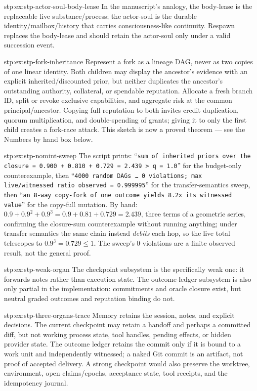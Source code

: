 \begin{pdSolution}{stp:ex:stp-actor-soul-body-lease}
In the manuscript's analogy, the body-lease is the replaceable live
substance/process; the actor-soul is the durable identity/mailbox/history that
carries consciousness-like continuity. Respawn replaces the body-lease and
should retain the actor-soul only under a valid succession event.
\end{pdSolution}
\begin{pdSolution}{stp:ex:stp-fork-inheritance}
Represent a fork as a lineage DAG, never as two copies of one linear identity.
Both children may display the ancestor's evidence with an explicit
inherited/discounted prior, but neither duplicates the ancestor's outstanding
authority, collateral, or spendable reputation. Allocate a fresh branch ID,
split or revoke exclusive capabilities, and aggregate risk at the common
principal/ancestor. Copying full reputation to both invites credit
duplication, quorum multiplication, and double-spending of grants; giving it
to only the first child creates a fork-race attack. This sketch is now a
proved theorem --- see the Numbers by hand box below.
\end{pdSolution}
\begin{pdSolution}{stp:ex:stp-nomint-sweep}
The script prints: ``\texttt{sum of inherited priors over the closure = 0.900
+ 0.810 + 0.729 = 2.439 > q = 1.0}'' for the budget-only counterexample, then
``\texttt{4000 random DAGs \dots{} 0 violations; max live/witnessed ratio
observed = 0.999995}'' for the transfer-semantics sweep, then ``\texttt{an
8-way copy-fork of one outcome yields 8.2x its witnessed value}'' for the
copy-full mutation. By hand: $0.9+0.9^2+0.9^3=0.9+0.81+0.729=2.439$, three
terms of a geometric series, confirming the closure-sum counterexample without
running anything; under transfer semantics the same chain instead \emph{debits}
each hop, so the live total telescopes to $0.9^3=0.729\le 1$.
The sweep's $0$ violations are a finite observed result, not the general proof.
\end{pdSolution}
\begin{pdSolution}{stp:ex:stp-weak-organ}
The checkpoint subsystem is the specifically weak one: it forwards notes rather
than execution state. The outcome-ledger subsystem is also only partial in the
implementation: commitments and oracle closure exist, but neutral graded
outcomes and reputation binding do not.
\end{pdSolution}
\begin{pdSolution}{stp:ex:stp-three-organs-trace}
Memory retains the session, notes, and explicit decisions. The current
checkpoint may retain a handoff and perhaps a committed diff, but not working
process state, tool handles, pending effects, or hidden provider state. The
outcome ledger retains the commit only if it is bound to a work unit and
independently witnessed; a naked Git commit is an artifact, not proof of
accepted delivery. A strong checkpoint would also preserve the worktree,
environment, open claims/epochs, acceptance state, tool receipts, and the
idempotency journal.
\end{pdSolution}
